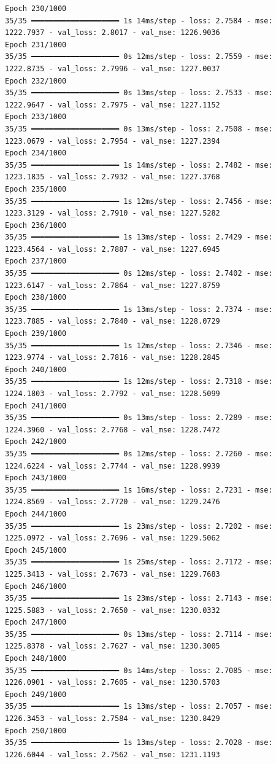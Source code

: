 \documentclass[
  letterpaper,
  DIV=11,
  numbers=noendperiod]{scrreprt}
\begin{document}
\begin{verbatim}
Epoch 230/1000
35/35 ━━━━━━━━━━━━━━━━━━━━ 1s 14ms/step - loss: 2.7584 - mse: 1222.7937 - val_loss: 2.8017 - val_mse: 1226.9036
Epoch 231/1000
35/35 ━━━━━━━━━━━━━━━━━━━━ 0s 12ms/step - loss: 2.7559 - mse: 1222.8735 - val_loss: 2.7996 - val_mse: 1227.0037
Epoch 232/1000
35/35 ━━━━━━━━━━━━━━━━━━━━ 0s 13ms/step - loss: 2.7533 - mse: 1222.9647 - val_loss: 2.7975 - val_mse: 1227.1152
Epoch 233/1000
35/35 ━━━━━━━━━━━━━━━━━━━━ 0s 13ms/step - loss: 2.7508 - mse: 1223.0679 - val_loss: 2.7954 - val_mse: 1227.2394
Epoch 234/1000
35/35 ━━━━━━━━━━━━━━━━━━━━ 1s 14ms/step - loss: 2.7482 - mse: 1223.1835 - val_loss: 2.7932 - val_mse: 1227.3768
Epoch 235/1000
35/35 ━━━━━━━━━━━━━━━━━━━━ 1s 12ms/step - loss: 2.7456 - mse: 1223.3129 - val_loss: 2.7910 - val_mse: 1227.5282
Epoch 236/1000
35/35 ━━━━━━━━━━━━━━━━━━━━ 1s 13ms/step - loss: 2.7429 - mse: 1223.4564 - val_loss: 2.7887 - val_mse: 1227.6945
Epoch 237/1000
35/35 ━━━━━━━━━━━━━━━━━━━━ 0s 12ms/step - loss: 2.7402 - mse: 1223.6147 - val_loss: 2.7864 - val_mse: 1227.8759
Epoch 238/1000
35/35 ━━━━━━━━━━━━━━━━━━━━ 1s 13ms/step - loss: 2.7374 - mse: 1223.7885 - val_loss: 2.7840 - val_mse: 1228.0729
Epoch 239/1000
35/35 ━━━━━━━━━━━━━━━━━━━━ 1s 12ms/step - loss: 2.7346 - mse: 1223.9774 - val_loss: 2.7816 - val_mse: 1228.2845
Epoch 240/1000
35/35 ━━━━━━━━━━━━━━━━━━━━ 1s 12ms/step - loss: 2.7318 - mse: 1224.1803 - val_loss: 2.7792 - val_mse: 1228.5099
Epoch 241/1000
35/35 ━━━━━━━━━━━━━━━━━━━━ 0s 13ms/step - loss: 2.7289 - mse: 1224.3960 - val_loss: 2.7768 - val_mse: 1228.7472
Epoch 242/1000
35/35 ━━━━━━━━━━━━━━━━━━━━ 0s 12ms/step - loss: 2.7260 - mse: 1224.6224 - val_loss: 2.7744 - val_mse: 1228.9939
Epoch 243/1000
35/35 ━━━━━━━━━━━━━━━━━━━━ 1s 16ms/step - loss: 2.7231 - mse: 1224.8569 - val_loss: 2.7720 - val_mse: 1229.2476
Epoch 244/1000
35/35 ━━━━━━━━━━━━━━━━━━━━ 1s 23ms/step - loss: 2.7202 - mse: 1225.0972 - val_loss: 2.7696 - val_mse: 1229.5062
Epoch 245/1000
35/35 ━━━━━━━━━━━━━━━━━━━━ 1s 25ms/step - loss: 2.7172 - mse: 1225.3413 - val_loss: 2.7673 - val_mse: 1229.7683
Epoch 246/1000
35/35 ━━━━━━━━━━━━━━━━━━━━ 1s 23ms/step - loss: 2.7143 - mse: 1225.5883 - val_loss: 2.7650 - val_mse: 1230.0332
Epoch 247/1000
35/35 ━━━━━━━━━━━━━━━━━━━━ 0s 13ms/step - loss: 2.7114 - mse: 1225.8378 - val_loss: 2.7627 - val_mse: 1230.3005
Epoch 248/1000
35/35 ━━━━━━━━━━━━━━━━━━━━ 0s 14ms/step - loss: 2.7085 - mse: 1226.0901 - val_loss: 2.7605 - val_mse: 1230.5703
Epoch 249/1000
35/35 ━━━━━━━━━━━━━━━━━━━━ 1s 13ms/step - loss: 2.7057 - mse: 1226.3453 - val_loss: 2.7584 - val_mse: 1230.8429
Epoch 250/1000
35/35 ━━━━━━━━━━━━━━━━━━━━ 1s 13ms/step - loss: 2.7028 - mse: 1226.6044 - val_loss: 2.7562 - val_mse: 1231.1193

\end{verbatim}
\end{document}
